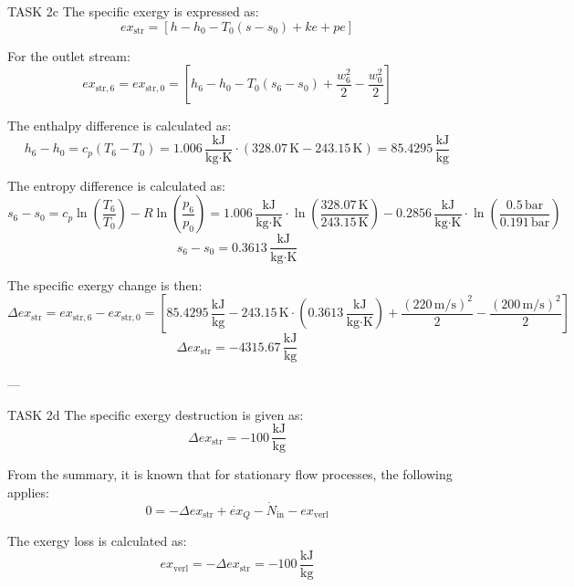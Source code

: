 TASK 2c  
The specific exergy is expressed as:  
\[
ex_{\text{str}} = \left[ h - h_0 - T_0 (s - s_0) + ke + pe \right]
\]  

For the outlet stream:  
\[
ex_{\text{str},6} = ex_{\text{str},0} = \left[ h_6 - h_0 - T_0 (s_6 - s_0) + \frac{w_6^2}{2} - \frac{w_0^2}{2} \right]
\]  

The enthalpy difference is calculated as:  
\[
h_6 - h_0 = c_p (T_6 - T_0) = 1.006 \, \frac{\text{kJ}}{\text{kg·K}} \cdot (328.07 \, \text{K} - 243.15 \, \text{K}) = 85.4295 \, \frac{\text{kJ}}{\text{kg}}
\]  

The entropy difference is calculated as:  
\[
s_6 - s_0 = c_p \ln \left( \frac{T_6}{T_0} \right) - R \ln \left( \frac{p_6}{p_0} \right) = 1.006 \, \frac{\text{kJ}}{\text{kg·K}} \cdot \ln \left( \frac{328.07 \, \text{K}}{243.15 \, \text{K}} \right) - 0.2856 \, \frac{\text{kJ}}{\text{kg·K}} \cdot \ln \left( \frac{0.5 \, \text{bar}}{0.191 \, \text{bar}} \right)
\]  
\[
s_6 - s_0 = 0.3613 \, \frac{\text{kJ}}{\text{kg·K}}
\]  

The specific exergy change is then:  
\[
\Delta ex_{\text{str}} = ex_{\text{str},6} - ex_{\text{str},0} = \left[ 85.4295 \, \frac{\text{kJ}}{\text{kg}} - 243.15 \, \text{K} \cdot (0.3613 \, \frac{\text{kJ}}{\text{kg·K}}) + \frac{(220 \, \text{m/s})^2}{2} - \frac{(200 \, \text{m/s})^2}{2} \right]
\]  
\[
\Delta ex_{\text{str}} = -4315.67 \, \frac{\text{kJ}}{\text{kg}}
\]  

---

TASK 2d  
The specific exergy destruction is given as:  
\[
\Delta ex_{\text{str}} = -100 \, \frac{\text{kJ}}{\text{kg}}
\]  

From the summary, it is known that for stationary flow processes, the following applies:  
\[
0 = -\Delta ex_{\text{str}} + \dot{ex}_Q - \dot{N}_{\text{in}} - ex_{\text{verl}}
\]  

The exergy loss is calculated as:  
\[
ex_{\text{verl}} = -\Delta ex_{\text{str}} = -100 \, \frac{\text{kJ}}{\text{kg}}
\]  

